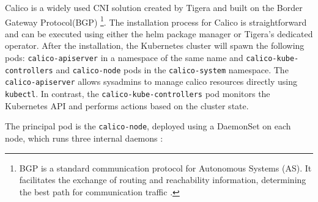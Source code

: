 Calico is a widely used CNI solution created by Tigera and built on the Border
Gateway Protocol(BGP) \footnote{BGP is a standard communication protocol for
Autonomous Systems (AS). It facilitates the exchange of routing and reachability
information, determining the best path for communication traffic
\cite{BGPnistdef}.}. The installation process for Calico is straightforward and
can be executed using either the helm package manager or Tigera's dedicated
operator. After the installation, the Kubernetes cluster will spawn the
following pods: \texttt{calico-apiserver} in a namespace of the same name and
\texttt{calico-kube-controllers} and \texttt{calico-node} pods in the
\texttt{calico-system} namespace. The \texttt{calico-apiserver} allows sysadmins
to manage calico resources directly using \texttt{kubectl}. In contrast, the
\texttt{calico-kube-controllers} pod monitors the Kubernetes API and performs
actions based on the cluster state.

The principal pod is the \texttt{calico-node}, deployed using a DaemonSet on
each node, which runs three internal daemons \cite{calicodoc}:

